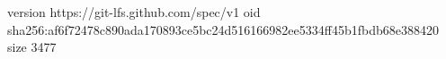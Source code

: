 version https://git-lfs.github.com/spec/v1
oid sha256:af6f72478c890ada170893ce5bc24d516166982ee5334ff45b1fbdb68e388420
size 3477
